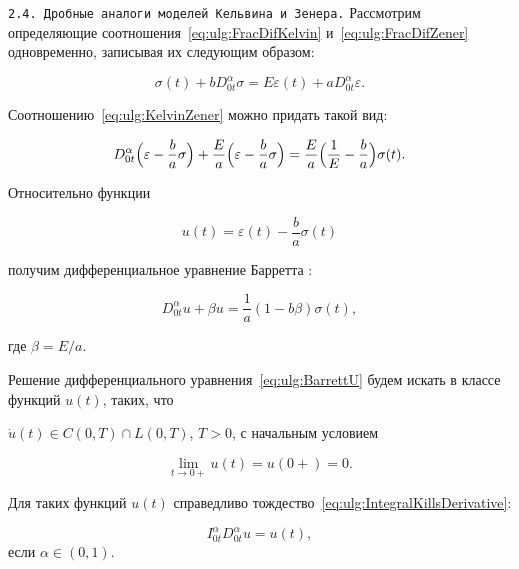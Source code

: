\texttt{2.4. Дробные аналоги моделей Кельвина и Зенера.} Рассмотрим определяющие соотношения~\eqref{eq:ulg:FracDifKelvin} и~\eqref{eq:ulg:FracDifZener} одновременно, записывая их следующим образом:

\begin{equation}\label{eq:ulg:KelvinZener}

\sigma(t)+b D_{0t}^{\alpha}\sigma=E\varepsilon(t)+a

D_{0t}^{\alpha}\varepsilon.

\end{equation}

Соотношению~\eqref{eq:ulg:KelvinZener} можно придать такой вид:

\begin{equation*}

D_{0t}^{\alpha}\Bigl(\varepsilon-\frac{b}{a}\sigma\Bigr)+\frac{E}{a}\Bigl(\varepsilon-\frac{b}{a}\sigma\Bigr)=\frac{E}{a}\Bigl(\frac{1}{E}-\frac{b}{a}\Bigr)\sigma(t).  \end{equation*}



Относительно функции 

$$u(t)=\varepsilon(t)- \frac ba \sigma(t)$$

получим дифференциальное уравнение Барретта \cite{ulg:bib:K-S-T,ulg:bib:Barrett}:

\begin{equation}\label{eq:ulg:BarrettU}

D_{0t}^{\alpha}u+\beta u=\frac{1}{a}(1-b\beta)\sigma(t),

\end{equation}

где $\beta=E/a$.



Решение дифференциального уравнения~\eqref{eq:ulg:BarrettU} будем искать в классе функций $u(t)$, таких, что

$\dot{u}(t)\in C(0,T)\cap L(0,T)$, $T>0$, с начальным условием

\begin{equation}\label{InitialConditionU0+}

\lim\limits_{t\rightarrow0+}u(t)=u(0+)=0.

\end{equation}



Для таких функций $u(t)$ справедливо тождество~\eqref{eq:ulg:IntegralKillsDerivative}:

 $$I_{0t}^{\alpha}D_{0t}^{\alpha}u=u(t),$$ если $\alpha\in(0, 1)$. 

